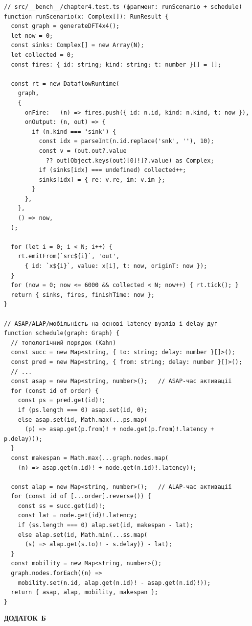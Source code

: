 \documentclass[
]{article}
\begin{document}
\begin{verbatim}
// src/__bench__/chapter4.test.ts (фрагмент: runScenario + schedule)
function runScenario(x: Complex[]): RunResult {
  const graph = generateDFT4x4();
  let now = 0;
  const sinks: Complex[] = new Array(N);
  let collected = 0;
  const fires: { id: string; kind: string; t: number }[] = [];

  const rt = new DataflowRuntime(
    graph,
    {
      onFire:   (n) => fires.push({ id: n.id, kind: n.kind, t: now }),
      onOutput: (n, out) => {
        if (n.kind === 'sink') {
          const idx = parseInt(n.id.replace('snk', ''), 10);
          const v = (out.out?.value
            ?? out[Object.keys(out)[0]!]?.value) as Complex;
          if (sinks[idx] === undefined) collected++;
          sinks[idx] = { re: v.re, im: v.im };
        }
      },
    },
    () => now,
  );

  for (let i = 0; i < N; i++) {
    rt.emitFrom(`src${i}`, 'out',
      { id: `x${i}`, value: x[i], t: now, originT: now });
  }
  for (now = 0; now <= 6000 && collected < N; now++) { rt.tick(); }
  return { sinks, fires, finishTime: now };
}

// ASAP/ALAP/мобільність на основі latency вузлів і delay дуг
function schedule(graph: Graph) {
  // топологічний порядок (Kahn)
  const succ = new Map<string, { to: string; delay: number }[]>();
  const pred = new Map<string, { from: string; delay: number }[]>();
  // ...
  const asap = new Map<string, number>();   // ASAP-час активації
  for (const id of order) {
    const ps = pred.get(id)!;
    if (ps.length === 0) asap.set(id, 0);
    else asap.set(id, Math.max(...ps.map(
      (p) => asap.get(p.from)! + node.get(p.from)!.latency + p.delay)));
  }
  const makespan = Math.max(...graph.nodes.map(
    (n) => asap.get(n.id)! + node.get(n.id)!.latency));

  const alap = new Map<string, number>();   // ALAP-час активації
  for (const id of [...order].reverse()) {
    const ss = succ.get(id)!;
    const lat = node.get(id)!.latency;
    if (ss.length === 0) alap.set(id, makespan - lat);
    else alap.set(id, Math.min(...ss.map(
      (s) => alap.get(s.to)! - s.delay)) - lat);
  }
  const mobility = new Map<string, number>();
  graph.nodes.forEach((n) =>
    mobility.set(n.id, alap.get(n.id)! - asap.get(n.id)!));
  return { asap, alap, mobility, makespan };
}
\end{verbatim}

\newpage
\protect{}\label{app:B}{}\textbf{ДОДАТОК~Б}
\end{document}
